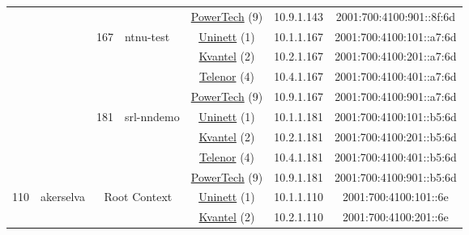 \begin{small}
\begin{center}
\begin{longtable}{|c|c|c|c|c|c|c|c|}
  &  &  &  & \multicolumn{2}{|c|}{\tiny{\href{http://www.powertech.no}{PowerTech} (9)}} & \tiny{10.9.1.143} & \tiny{2001:700:4100:901::8f:6d} \\* \cline{3-3}\cline{4-4}\cline{5-5}\cline{6-6}\cline{7-7}\cline{8-8}
  &  & \multirow{4}{*}{\tiny{167}} & \multicolumn{1}{|l|}{\multirow{4}{*}{\tiny{ntnu-test}}} & \multicolumn{2}{|c|}{\tiny{\href{https://www.uninett.no}{Uninett} (1)}} & \tiny{10.1.1.167} & \tiny{2001:700:4100:101::a7:6d} \\* \cline{5-5}\cline{6-6}\cline{7-7}\cline{8-8}
  &  &  &  & \multicolumn{2}{|c|}{\tiny{\href{http://kvantel.no}{Kvantel} (2)}} & \tiny{10.2.1.167} & \tiny{2001:700:4100:201::a7:6d} \\* \cline{5-5}\cline{6-6}\cline{7-7}\cline{8-8}
  &  &  &  & \multicolumn{2}{|c|}{\tiny{\href{https://www.telenor.no}{Telenor} (4)}} & \tiny{10.4.1.167} & \tiny{2001:700:4100:401::a7:6d} \\* \cline{5-5}\cline{6-6}\cline{7-7}\cline{8-8}
  &  &  &  & \multicolumn{2}{|c|}{\tiny{\href{http://www.powertech.no}{PowerTech} (9)}} & \tiny{10.9.1.167} & \tiny{2001:700:4100:901::a7:6d} \\* \cline{3-3}\cline{4-4}\cline{5-5}\cline{6-6}\cline{7-7}\cline{8-8}
  &  & \multirow{4}{*}{\tiny{181}} & \multicolumn{1}{|l|}{\multirow{4}{*}{\tiny{srl-nndemo}}} & \multicolumn{2}{|c|}{\tiny{\href{https://www.uninett.no}{Uninett} (1)}} & \tiny{10.1.1.181} & \tiny{2001:700:4100:101::b5:6d} \\* \cline{5-5}\cline{6-6}\cline{7-7}\cline{8-8}
  &  &  &  & \multicolumn{2}{|c|}{\tiny{\href{http://kvantel.no}{Kvantel} (2)}} & \tiny{10.2.1.181} & \tiny{2001:700:4100:201::b5:6d} \\* \cline{5-5}\cline{6-6}\cline{7-7}\cline{8-8}
  &  &  &  & \multicolumn{2}{|c|}{\tiny{\href{https://www.telenor.no}{Telenor} (4)}} & \tiny{10.4.1.181} & \tiny{2001:700:4100:401::b5:6d} \\* \cline{5-5}\cline{6-6}\cline{7-7}\cline{8-8}
  &  &  &  & \multicolumn{2}{|c|}{\tiny{\href{http://www.powertech.no}{PowerTech} (9)}} & \tiny{10.9.1.181} & \tiny{2001:700:4100:901::b5:6d} \\ \hline
 \multirow{32}{*}{\tiny{110}} & \multicolumn{1}{|l|}{\multirow{32}{*}{\tiny{akerselva}}} & \multicolumn{2}{|c|}{\multirow{4}{*}{\tiny{Root Context}}} & \multicolumn{2}{|c|}{\tiny{\href{https://www.uninett.no}{Uninett} (1)}} & \tiny{10.1.1.110} & \tiny{2001:700:4100:101::6e} \\* \cline{5-5}\cline{6-6}\cline{7-7}\cline{8-8}
  &  & \multicolumn{2}{|c|}{} & \multicolumn{2}{|c|}{\tiny{\href{http://kvantel.no}{Kvantel} (2)}} & \tiny{10.2.1.110} & \tiny{2001:700:4100:201::6e} \\* \cline{5-5}\cline{6-6}\cline{7-7}\cline{8-8}

\end{longtable}
\end{center}
\end{small}
